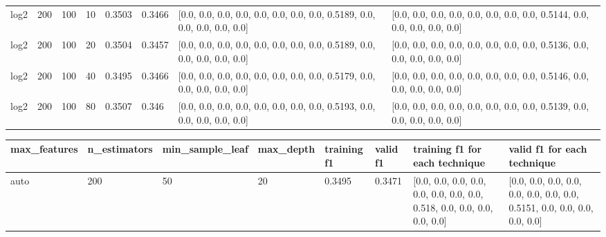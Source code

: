 \documentclass{article}%
\begin{document}
\begin{longtable}{l l l l l l l l}
log2&200&100&10&0.3503&0.3466&{[}0.0, 0.0, 0.0, 0.0, 0.0, 0.0, 0.0, 0.0, 0.5189, 0.0, 0.0, 0.0, 0.0, 0.0{]}&{[}0.0, 0.0, 0.0, 0.0, 0.0, 0.0, 0.0, 0.0, 0.5144, 0.0, 0.0, 0.0, 0.0, 0.0{]}\\%
log2&200&100&20&0.3504&0.3457&{[}0.0, 0.0, 0.0, 0.0, 0.0, 0.0, 0.0, 0.0, 0.5189, 0.0, 0.0, 0.0, 0.0, 0.0{]}&{[}0.0, 0.0, 0.0, 0.0, 0.0, 0.0, 0.0, 0.0, 0.5136, 0.0, 0.0, 0.0, 0.0, 0.0{]}\\%
log2&200&100&40&0.3495&0.3466&{[}0.0, 0.0, 0.0, 0.0, 0.0, 0.0, 0.0, 0.0, 0.5179, 0.0, 0.0, 0.0, 0.0, 0.0{]}&{[}0.0, 0.0, 0.0, 0.0, 0.0, 0.0, 0.0, 0.0, 0.5146, 0.0, 0.0, 0.0, 0.0, 0.0{]}\\%
log2&200&100&80&0.3507&0.346&{[}0.0, 0.0, 0.0, 0.0, 0.0, 0.0, 0.0, 0.0, 0.5193, 0.0, 0.0, 0.0, 0.0, 0.0{]}&{[}0.0, 0.0, 0.0, 0.0, 0.0, 0.0, 0.0, 0.0, 0.5139, 0.0, 0.0, 0.0, 0.0, 0.0{]}\\%
\hline%
\end{longtable}%
\begin{longtable}{l l l l l l l l}%
\hline%
max\_features&n\_estimators&min\_sample\_leaf&max\_depth&training f1&valid f1&training f1 for each technique&valid f1 for each technique\\%
\hline%
\endhead%
\hline%
auto&200&50&20&0.3495&0.3471&{[}0.0, 0.0, 0.0, 0.0, 0.0, 0.0, 0.0, 0.0, 0.518, 0.0, 0.0, 0.0, 0.0, 0.0{]}&{[}0.0, 0.0, 0.0, 0.0, 0.0, 0.0, 0.0, 0.0, 0.5151, 0.0, 0.0, 0.0, 0.0, 0.0{]}\\%
\hline%
\end{longtable}%
\end{document}
